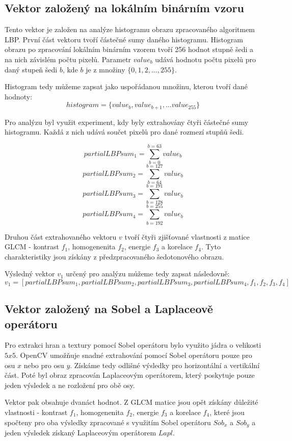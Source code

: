 \subsection{Vektor založený na lokálním binárním vzoru}
Tento vektor je založen na analýze histogramu obrazu zpracovaného algoritmem LBP. První část vektoru tvoří částečné sumy daného histogramu. Histogram obrazu po zpracování lokálním binárním vzorem tvoří 256 hodnot stupně šedi a na nich závislém počtu pixelů. Parametr $value_b$ udává hodnotu počtu pixelů pro daný stupeň šedi $b$, kde $b$ je z množiny $\{0,1,2,...,255\}$.

Histogram tedy můžeme zapsat jako uspořádanou množinu, kterou tvoří dané hodnoty:
$$histogram = \{value_b, value_{b+1}, ... value_{255}\}$$

Pro analýzu byl využit experiment, kdy byly extrahovány čtyři částečné sumy histogramu. Každá z nich udává součet pixelů pro dané rozmezí stupňů šedi.

$$partialLBPsum_1 = \sum_{b=0}^{b=63} value_b $$
$$partialLBPsum_2 = \sum_{b=64}^{b=127} value_b $$
$$partialLBPsum_3 = \sum_{b=128}^{b=191} value_b $$
$$partialLBPsum_4 = \sum_{b=192}^{b=255} value_b $$

Druhou část extrahovaného vektoru $v$ tvoří čtyři zjišťované vlastnosti z matice GLCM - kontrast $f_1$, homogenenita $f_2$, energie $f_3$ a korelace $f_4$. Tyto charakteristiky jsou získány z předzpracovaného šedotonového obrazu.

Výsledný vektor $v_1$ určený pro analýzu můžeme tedy zapsat následovně:
$$v_1 = [partialLBPsum_1, partialLBPsum_2, partialLBPsum_3, partialLBPsum_4, f_1, f_2, f_3, f_4]$$

\subsection{Vektor založený na Sobel a Laplaceově operátoru}
Pro extrakci hran a textury pomocí Sobel operátoru bylo využito jádra o velikosti $5x5$. OpenCV umožňuje snadné extrahování pomocí Sobel operátoru pouze pro osu $x$ nebo pro osu $y$. Získáme tedy odlišné výsledky pro horizontální a vertikální část. Poté byl obraz zpracován Laplaceovým operátorem, který poskytuje pouze jeden výsledek a ne rozložení pro obě osy. 

Vektor pak obsahuje dvanáct hodnot. Z GLCM matice jsou opět získány důležité vlastnosti - kontrast $f_1$, homogenenita $f_2$, energie $f_3$ a korelace $f_4$, které jsou spočteny pro oba výsledky zpracované s využitím Sobel operátoru $Sob_x$ a $Sob_y$ a jeden výsledek získaný Laplaceovým operátorem $Lapl$.

